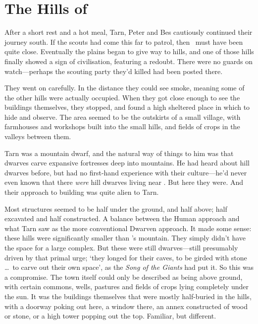 \chapter{The Hills of \tholkunrond}

After a short rest and a hot meal, Tarn, Peter and Bes cautiously continued their journey south.  If the scouts had come this far to patrol, then \tholkunrond\ must have been quite close.  Eventually the plains began to give way to hills, and one of those hills finally showed a sign of civilisation, featuring a redoubt.  There were no guards on watch---perhaps the scouting party they'd killed had been posted there.

They went on carefully.  In the distance they could see smoke, meaning some of the other hills were actually occupied.  When they got close enough to see the buildings themselves, they stopped, and found a high sheltered place in which to hide and observe.  The area seemed to be the outskirts of a small village, with farmhouses and workshops built into the small hills, and fields of crops in the valleys between them.

Tarn was a mountain dwarf, and the natural way of things to him was that dwarves carve expansive fortresses deep into mountains.  He had heard about hill dwarves before, but had no first-hand experience with their culture---he'd never even known that there \emph{were} hill dwarves living near \korbarthrond.  But here they were.  And their approach to building was quite alien to Tarn.

Most structures seemed to be half under the ground, and half above; half excavated and half constructed.  A balance between the Human approach and what Tarn saw as the more conventional Dwarven approach.  It made some sense: these hills were significantly smaller than \korbarthrond's mountain.  They simply didn't have the space for a large complex.  But these were still dwarves---still presumably driven by that primal urge; `they longed for their caves, to be girded with stone \ldots\ to carve out their own space', as the \emph{Song of the Giants} had put it.  So this was a compromise.  The town itself could only be described as being above ground, with certain commons, wells, pastures and fields of crops lying completely under the sun.  It was the buildings themselves that were mostly half-buried in the hills, with a doorway poking out here, a window there, an annex constructed of wood or stone, or a high tower popping out the top.  Familiar, but different.

